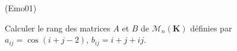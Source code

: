 \begin{tiny}(Emo01)\end{tiny}
Calculer le rang des matrices $A$ et $B$ de $\mathcal{M}_{n}(\mathbf{K})$ d{\'e}finies par $a_{ij}=\cos (i+j-2)$, $ b_{ij}=i+j+ij$.